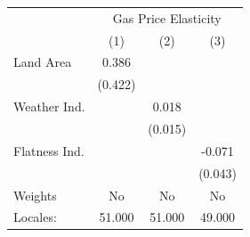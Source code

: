 {
\def\sym#1{\ifmmode^{#1}\else\(^{#1}\)\fi}
\begin{tabular}{l*{3}{c}}
\hline\hline
            &\multicolumn{3}{c}{Gas Price Elasticity}                         \\
            &\multicolumn{1}{c}{(1)}         &\multicolumn{1}{c}{(2)}         &\multicolumn{1}{c}{(3)}         \\
\hline
Land Area   &       0.386         &                     &                     \\
            &     (0.422)         &                     &                     \\
[1em]
Weather Ind.&                     &       0.018         &                     \\
            &                     &     (0.015)         &                     \\
[1em]
Flatness Ind.&                     &                     &      -0.071         \\
            &                     &                     &     (0.043)         \\
\hline
Weights     &          No         &          No         &          No         \\
Locales:    &      51.000         &      51.000         &      49.000         \\
\hline\hline
\end{tabular}
}
